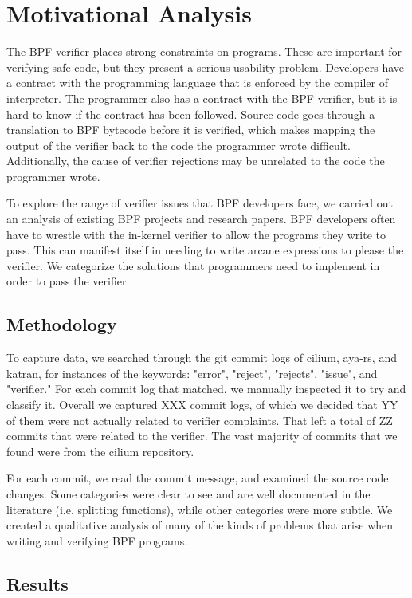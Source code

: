 \section{Motivational Analysis}

The BPF verifier places strong constraints on programs.
These are important for verifying safe code, but they present a serious usability problem.
Developers have a contract with the programming language that is enforced by the compiler of interpreter.
The programmer also has a contract with the BPF verifier, but it is hard to know if the contract has been followed.
Source code goes through a translation to BPF bytecode before it is verified, which makes mapping the output of the verifier back to the code the programmer wrote difficult.
Additionally, the cause of verifier rejections may be unrelated to the code the programmer wrote.

To explore the range of verifier issues that BPF developers face, we carried out an analysis of existing BPF projects and research papers.
BPF developers often have to wrestle with the in-kernel verifier to allow the programs they write to pass.
This can manifest itself in needing to write arcane expressions to please the verifier.
We categorize the solutions that programmers need to implement in order to pass the verifier.

\subsection{Methodology}
To capture data, we searched through the git commit logs of cilium, aya-rs, and katran, for instances of the keywords: "error", "reject", "rejects", "issue", and "verifier." 
For each commit log that matched, we manually inspected it to try and classify it.
Overall we captured XXX commit logs, of which we decided that YY of them were not actually related to verifier complaints.
That left a total of ZZ commits that were related to the verifier.
The vast majority of commits that we found were from the cilium repository.

For each commit, we read the commit message, and examined the source code changes.
Some categories were clear to see and are well documented in the literature (i.e. splitting functions), while other categories were more subtle.
We created a qualitative analysis of many of the kinds of problems that arise when writing and verifying BPF programs.

\subsection{Results}

